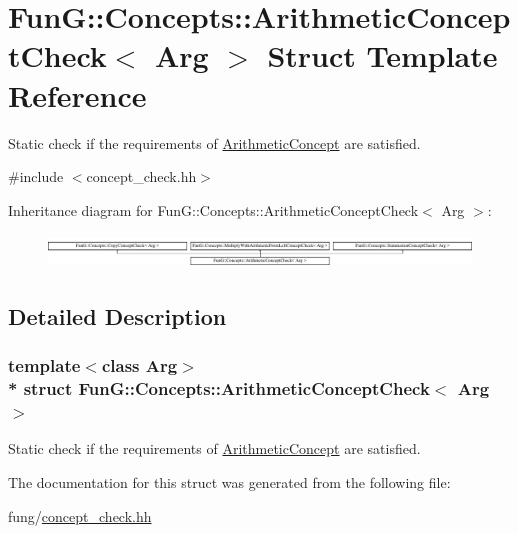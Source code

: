 \hypertarget{structFunG_1_1Concepts_1_1ArithmeticConceptCheck}{}\section{FunG\+:\+:Concepts\+:\+:Arithmetic\+Concept\+Check$<$ Arg $>$ Struct Template Reference}
\label{structFunG_1_1Concepts_1_1ArithmeticConceptCheck}


Static check if the requirements of \hyperlink{structFunG_1_1Concepts_1_1ArithmeticConcept}{Arithmetic\+Concept} are satisfied.  




{\ttfamily \#include $<$concept\+\_\+check.\+hh$>$}

Inheritance diagram for FunG\+:\+:Concepts\+:\+:Arithmetic\+Concept\+Check$<$ Arg $>$\+:\begin{figure}[H]
\begin{center}
\leavevmode
\includegraphics[height=0.893142cm]{structFunG_1_1Concepts_1_1ArithmeticConceptCheck}
\end{center}
\end{figure}


\subsection{Detailed Description}
\subsubsection*{template$<$class Arg$>$\\*
struct Fun\+G\+::\+Concepts\+::\+Arithmetic\+Concept\+Check$<$ Arg $>$}

Static check if the requirements of \hyperlink{structFunG_1_1Concepts_1_1ArithmeticConcept}{Arithmetic\+Concept} are satisfied. 

The documentation for this struct was generated from the following file\+:\begin{DoxyCompactItemize}
\item 
fung/\hyperlink{concept__check_8hh}{concept\+\_\+check.\+hh}\end{DoxyCompactItemize}
